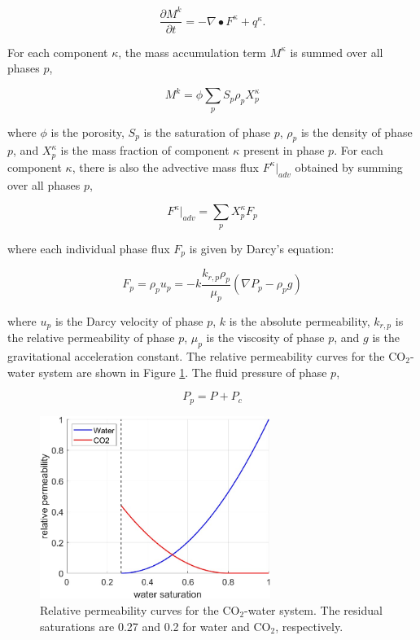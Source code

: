 \documentclass[10pt, twoside]{article}
\begin{document}
\begin{equation} \label{eq1}
    \frac{\partial M^k}{\partial t} = -\nabla \bullet F^\kappa + q^\kappa .
\end{equation}

For each component $\kappa$, the mass accumulation term $M^\kappa$ is summed over all phases $p$,

\begin{equation} \label{eq2}
    M^k = \phi \sum_p S_p \rho_p X_p^\kappa
\end{equation}

where $\phi$ is the porosity, $S_p$ is the saturation of phase $p$, $\rho_p$ is the density of phase $p$, and $X_p^\kappa$ is the mass fraction of component $\kappa$ present in phase $p$. For each component $\kappa$, there is also the advective mass flux $F^\kappa \rvert_{adv}$ obtained by summing over all phases $p$, 

\begin{equation} \label{eq3}
    F^\kappa \rvert_{adv} = \sum_p X_p^\kappa F_p
\end{equation}

where each individual phase flux $F_p$ is given by Darcy's equation:

\begin{equation} \label{eq4}
    F_p = \rho_p u_p = -k \frac{k_{r,p} \rho_p}{\mu_p} (\nabla P_p - \rho_p g)
\end{equation}

where $u_p$ is the Darcy velocity of phase $p$, $k$ is the absolute permeability, $k_{r,p}$ is the relative permeability of phase $p$, $\mu_p$ is the viscosity of phase $p$, and $g$ is the gravitational acceleration constant. The relative permeability curves for the CO$_2$-water system are shown in Figure \ref{relperms}. The fluid pressure of phase $p$,

\begin{equation} \label{eq5}
    P_p = P + P_c
\end{equation}

\begin{figure}
    \centering
    \includegraphics[width=7.5cm]{figures/relperms.jpg}
    \caption{Relative permeability curves for the CO$_2$-water system. The residual saturations are 0.27 and 0.2 for water and CO$_2$, respectively.}
    \label{relperms}
\end{figure}
\end{document}
